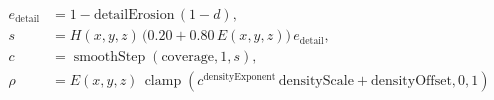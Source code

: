 \documentclass[border=6pt]{standalone}
\begin{document}
\color{black}
\(\displaystyle
\begin{aligned}
e_{\mathrm{detail}} &= 1-\mathrm{detailErosion}\,(1-d),\\
s &= H(x,y,z)\,\bigl(0.20+0.80\,E(x,y,z)\bigr)\,e_{\mathrm{detail}},\\
c &= \operatorname{smoothStep}(\mathrm{coverage},1,s),\\
\rho &= E(x,y,z)\,
\operatorname{clamp}\!\left(c^{\mathrm{densityExponent}}\,
\mathrm{densityScale}+\mathrm{densityOffset},0,1\right)
\end{aligned}
\)
\end{document}
